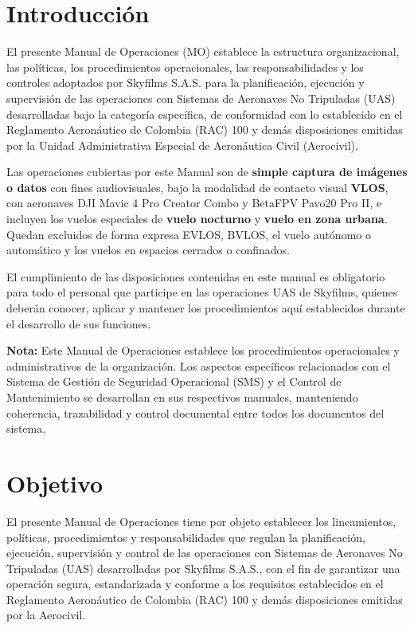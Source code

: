 

\section{Introducción}
\label{inicio_cap1}

El presente Manual de Operaciones (MO) establece la estructura organizacional, las políticas, los procedimientos operacionales, las responsabilidades y los controles adoptados por Skyfilms S.A.S. para la planificación, ejecución y supervisión de las operaciones con Sistemas de Aeronaves No Tripuladas (UAS) desarrolladas bajo la categoría específica, de conformidad con lo establecido en el Reglamento Aeronáutico de Colombia (RAC) 100 y demás disposiciones emitidas por la Unidad Administrativa Especial de Aeronáutica Civil (Aerocivil).

Las operaciones cubiertas por este Manual son de \textbf{simple captura de imágenes o datos} con fines audiovisuales, bajo la modalidad de contacto visual \textbf{VLOS}, con aeronaves DJI Mavic 4 Pro Creator Combo y BetaFPV Pavo20 Pro II, e incluyen los vuelos especiales de \textbf{vuelo nocturno} y \textbf{vuelo en zona urbana}. Quedan excluidos de forma expresa EVLOS, BVLOS, el vuelo autónomo o automático y los vuelos en espacios cerrados o confinados.

El cumplimiento de las disposiciones contenidas en este manual es obligatorio para todo el personal que participe en las operaciones UAS de Skyfilms, quienes deberán conocer, aplicar y mantener los procedimientos aquí establecidos durante el desarrollo de sus funciones.


\textbf{Nota:} Este Manual de Operaciones establece los procedimientos operacionales y administrativos de la organización. Los aspectos específicos relacionados con el Sistema de Gestión de Seguridad Operacional (SMS) y el Control de Mantenimiento se desarrollan en sus respectivos manuales, manteniendo coherencia, trazabilidad y control documental entre todos los documentos del sistema.


\section{Objetivo}

El presente Manual de Operaciones tiene por objeto establecer los lineamientos, políticas, procedimientos y responsabilidades que regulan la planificación, ejecución, supervisión y control de las operaciones con Sistemas de Aeronaves No Tripuladas (UAS) desarrolladas por Skyfilms S.A.S., con el fin de garantizar una operación segura, estandarizada y conforme a los requisitos establecidos en el Reglamento Aeronáutico de Colombia (RAC) 100 y demás disposiciones emitidas por la Aerocivil.



